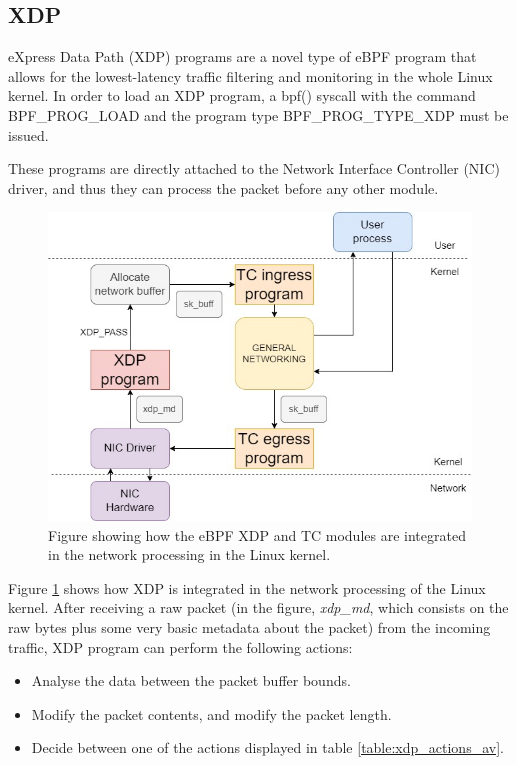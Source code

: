 \documentclass[12pt]{report} %
\begin{document}
\subsection{XDP}
eXpress Data Path (XDP) programs are a novel type of eBPF program that allows for the lowest-latency traffic filtering and monitoring in the whole Linux kernel. In order to load an XDP program, a bpf() syscall with the command BPF\_PROG\_LOAD and the program type BPF\_PROG\_TYPE\_XDP must be issued. 

These programs are directly attached to the Network Interface Controller (NIC) driver, and thus they can process the packet before any other module\cite{xdp_gentle_intro}.

\begin{figure}[H]
	\centering
	\includegraphics[width=15cm]{xdp_diag.jpg}
	\caption{Figure showing how the eBPF XDP and TC modules are integrated in the network processing in the Linux kernel.}
	\label{fig:xdp_diag}
\end{figure}

Figure \ref{fig:xdp_diag} shows how XDP is integrated in the network processing of the Linux kernel. After receiving a raw packet (in the figure, \textit{xdp\_md}, which consists on the raw bytes plus some very basic metadata about the packet) from the incoming traffic, XDP program can perform the following actions\cite{xdp_manual}:
\begin{itemize}
\item Analyse the data between the packet buffer bounds.
\item Modify the packet contents, and modify the packet length.
\item Decide between one of the actions displayed in table \ref{table:xdp_actions_av}.
\end{itemize}
\end{document}

